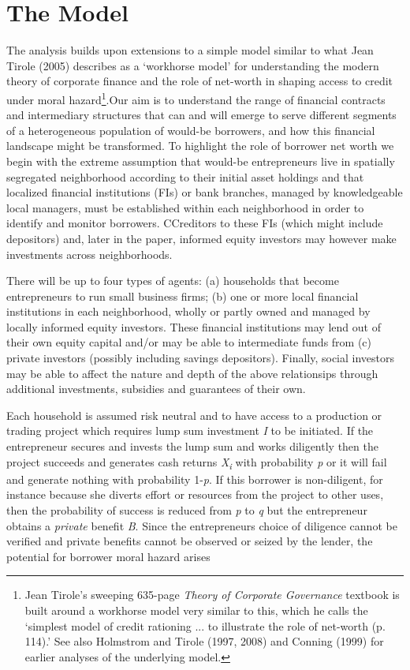 \documentclass[
]{article}
\begin{document}
\hypertarget{the-model}{%
\section{The Model}\label{the-model}}

The analysis builds upon extensions to a simple model similar to what
Jean Tirole (2005) describes as a `workhorse model' for understanding
the modern theory of corporate finance and the role of net-worth in
shaping access to credit under moral hazard\footnote{Jean Tirole's
  sweeping 635-page \emph{Theory of Corporate Governance} textbook is
  built around a workhorse model very similar to this, which he calls
  the `simplest model of credit rationing ... to illustrate the role of
  net-worth (p. 114).' See also Holmstrom and Tirole (1997, 2008) and
  Conning (1999) for earlier analyses of the underlying model.}.Our aim
is to understand the range of financial contracts and intermediary
structures that can and will emerge to serve different segments of a
heterogeneous population of would-be borrowers, and how this financial
landscape might be transformed. To highlight the role of borrower net
worth we begin with the extreme assumption that would-be entrepreneurs
live in spatially segregated neighborhood according to their initial
asset holdings and that localized financial institutions (FIs) or bank
branches, managed by knowledgeable local managers, must be established
within each neighborhood in order to identify and monitor borrowers.
CCreditors to these FIs (which might include depositors) and, later in
the paper, informed equity investors may however make investments across
neighborhoods.

There will be up to four types of agents: (a) households that become
entrepreneurs to run small business firms; (b) one or more local
financial institutions in each neighborhood, wholly or partly owned and
managed by locally informed equity investors. These financial
institutions may lend out of their own equity capital and/or may be able
to intermediate funds from (c) private investors (possibly including
savings depositors). Finally, social investors may be able to affect the
nature and depth of the above relationsips through additional
investments, subsidies and guarantees of their own.

Each household is assumed risk neutral and to have access to a
production or trading project which requires lump sum investment
\emph{I} to be initiated. If the entrepreneur secures and invests the
lump sum and works diligently then the project succeeds and generates
cash returns \emph{X\textsubscript{i}} with probability \emph{p} or it
will fail and generate nothing with probability 1-\emph{p}. If this
borrower is non-diligent, for instance because she diverts effort or
resources from the project to other uses, then the probability of
success is reduced from \emph{p} to \emph{q} but the entrepreneur
obtains a \emph{private} benefit \emph{B}. Since the entrepreneurs
choice of diligence cannot be verified and private benefits cannot be
observed or seized by the lender, the potential for borrower moral
hazard arises
\end{document}

